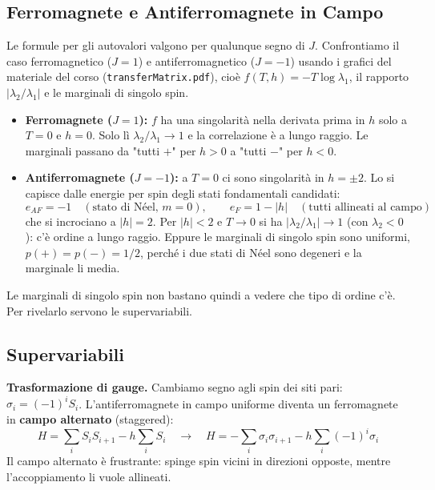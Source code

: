 \subsection{Ferromagnete e Antiferromagnete in Campo}

Le formule per gli autovalori valgono per qualunque segno di $J$. Confrontiamo il caso ferromagnetico ($J=1$) e antiferromagnetico ($J=-1$) usando i grafici del materiale del corso (\texttt{transferMatrix.pdf}), cioè $f(T,h) = -T\log\lambda_1$, il rapporto $|\lambda_2/\lambda_1|$ e le marginali di singolo spin.

\begin{itemize}
    \item \textbf{Ferromagnete ($J=1$):} $f$ ha una singolarità nella derivata prima in $h$ solo a $T=0$ e $h=0$. Solo lì $\lambda_2/\lambda_1 \to 1$ e la correlazione è a lungo raggio. Le marginali passano da "tutti $+$" per $h>0$ a "tutti $-$" per $h<0$.
    \item \textbf{Antiferromagnete ($J=-1$):} a $T=0$ ci sono singolarità in $h = \pm 2$. Lo si capisce dalle energie per spin degli stati fondamentali candidati:
    \begin{equation}
        e_{AF} = -1 \quad (\text{stato di Néel, } m=0), \qquad e_{F} = 1 - |h| \quad (\text{tutti allineati al campo})
    \end{equation}
    che si incrociano a $|h| = 2$. Per $|h| < 2$ e $T \to 0$ si ha $|\lambda_2/\lambda_1| \to 1$ (con $\lambda_2 < 0$): c'è ordine a lungo raggio. Eppure le marginali di singolo spin sono uniformi, $p(+) = p(-) = 1/2$, perché i due stati di Néel sono degeneri e la marginale li media.
\end{itemize}

\noindent Le marginali di singolo spin non bastano quindi a vedere che tipo di ordine c'è. Per rivelarlo servono le supervariabili.

\subsection{Supervariabili}

\textbf{Trasformazione di gauge.} Cambiamo segno agli spin dei siti pari: $\sigma_i = (-1)^i S_i$. L'antiferromagnete in campo uniforme diventa un ferromagnete in \textbf{campo alternato} (staggered):
\begin{equation}
    H = \sum_i S_i S_{i+1} - h\sum_i S_i \quad \longrightarrow \quad H = -\sum_i \sigma_i \sigma_{i+1} - h\sum_i (-1)^i \sigma_i
\end{equation}
Il campo alternato è frustrante: spinge spin vicini in direzioni opposte, mentre l'accoppiamento li vuole allineati.


